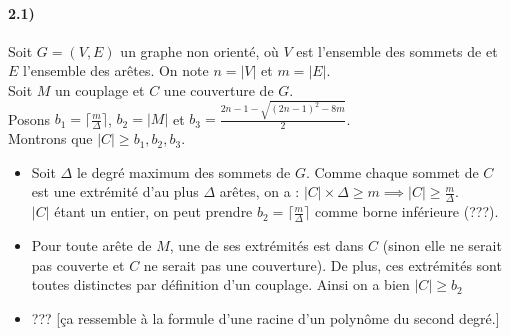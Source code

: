 \documentclass[12pt]{article}
\begin{document}
    \paragraph{2.1)}
        Soit $G=(V,E)$ un graphe non orienté, où $V$ est l'ensemble des sommets de et $E$ l'ensemble des arêtes. On note $n = |V|$ et $m = |E|$. \\
        Soit $M$ un couplage et $C$ une couverture de $G$. \\
        Posons $b_1 = \lceil \frac{m}{\Delta} \rceil$, $b_2 = |M|$ et $b_3 = \frac{2n-1 - \sqrt{(2n-1)^2 - 8m}}{2}$. \\
        Montrons que $|C| \geq b_1,b_2,b_3$.

        \begin{itemize}
            \item Soit $\Delta$ le degré maximum des sommets de $G$. Comme chaque sommet de $C$ est une extrémité d'au plus $\Delta$ arêtes, on a : $|C| \times \Delta \geq m \implies |C| \geq \frac{m}{\Delta}$. \\
            $|C|$ étant un entier, on peut prendre $b_2 = \lceil \frac{m}{\Delta} \rceil$ comme borne inférieure (???). 
            \item Pour toute arête de $M$, une de ses extrémités est dans $C$ (sinon elle ne serait pas couverte et $C$ ne serait pas une couverture). De plus, ces extrémités sont toutes distinctes par définition d'un couplage. Ainsi on a bien $\boxed{|C| \geq b_2}$
            \item ??? [ça ressemble à la formule d'une racine d'un polynôme du second degré.]
        \end{itemize}
\end{document}
